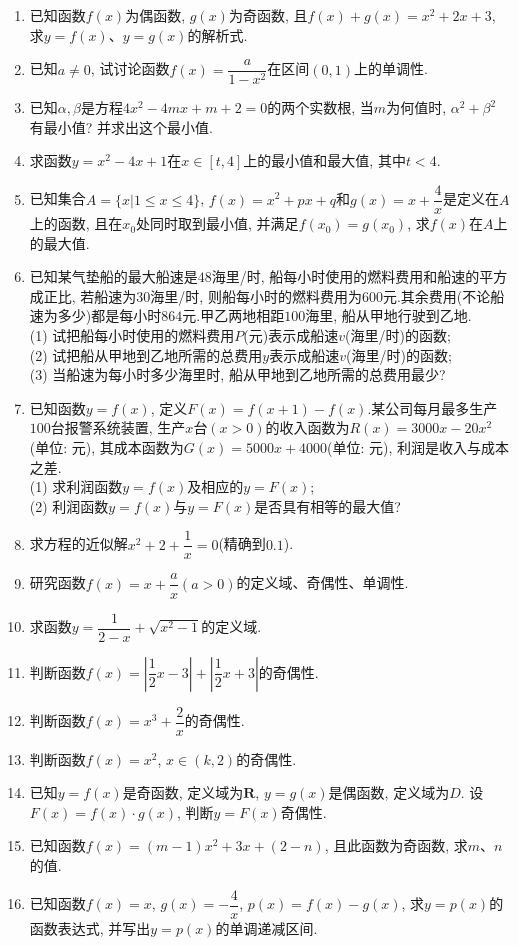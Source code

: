 \documentclass[10pt,a4paper]{article}
\begin{document}
\begin{enumerate}[1.]
\item 已知函数$f(x)$为偶函数, $g(x)$为奇函数, 且$f(x)+g(x)=x^2+2x+3$, 求$y=f(x)$、$y=g(x)$的解析式.
\item 已知$a\ne 0$, 试讨论函数$f(x)=\dfrac a{1-x^2}$在区间$(0,1)$上的单调性.
\item 已知$\alpha,\beta$是方程$4x^2-4mx+m+2=0$的两个实数根, 当$m$为何值时, $\alpha ^2+\beta ^2$有最小值? 并求出这个最小值.
\item 求函数$y=x^2-4x+1$在$x\in [t,4]$上的最小值和最大值, 其中$t<4$.
\item 已知集合$A=\{x|1\le x\le 4\}$, $f(x)=x^2+px+q$和$g(x)=x+\dfrac 4x$是定义在$A$上的函数, 且在$x_0$处同时取到最小值, 并满足$f(x_0)=g(x_0)$, 求$f(x)$在$A$上的最大值.
\item 已知某气垫船的最大船速是$48$海里/时, 船每小时使用的燃料费用和船速的平方成正比, 若船速为$30$海里/时, 则船每小时的燃料费用为$600$元.其余费用(不论船速为多少)都是每小时$864$元.甲乙两地相距$100$海里, 船从甲地行驶到乙地.\\
(1) 试把船每小时使用的燃料费用$P$(元)表示成船速$v$(海里/时)的函数;\\
(2) 试把船从甲地到乙地所需的总费用$y$表示成船速$v$(海里/时)的函数;\\
(3) 当船速为每小时多少海里时, 船从甲地到乙地所需的总费用最少?
\item 已知函数$y=f(x)$, 定义$F(x)=f(x+1)-f(x)$.某公司每月最多生产$100$台报警系统装置, 生产$x$台$(x>0)$的收入函数为$R(x)=3000x-20x^2$(单位: 元), 其成本函数为$G(x)=5000x+4000$(单位: 元), 利润是收入与成本之差.\\
(1) 求利润函数$y=f(x)$及相应的$y=F(x)$;\\
(2) 利润函数$y=f(x)$与$y=F(x)$是否具有相等的最大值?
\item 求方程的近似解$x^2+2+\dfrac 1x=0$(精确到$0.1$).
\item 研究函数$f(x)=x+\dfrac ax(a>0)$的定义域、奇偶性、单调性.
\item 求函数$y=\dfrac 1{2-x}+\sqrt {x^2-1}$的定义域.
\item 判断函数$f(x)=|\dfrac 12x-3|+|\dfrac 12x+3|$的奇偶性.
\item 判断函数$f(x)=x^3+\dfrac 2x$的奇偶性.
\item 判断函数$f(x)=x^2$, $x\in (k,2)$的奇偶性.
\item 已知$y=f(x)$是奇函数, 定义域为$\mathbf{R}$, $y=g(x)$是偶函数, 定义域为$D$. 设$F(x)=f(x)\cdot g(x)$, 判断$y=F(x)$奇偶性.
\item 已知函数$f(x)=(m-1)x^2+3x+(2-n)$, 且此函数为奇函数, 求$m$、$n$的值.
\item 已知函数$f(x)=x$, $g(x)=-\dfrac 4x$, $p(x)=f(x)-g(x)$, 求$y=p(x)$的函数表达式, 并写出$y=p(x)$的单调递减区间.

\end{enumerate}
\end{document}
